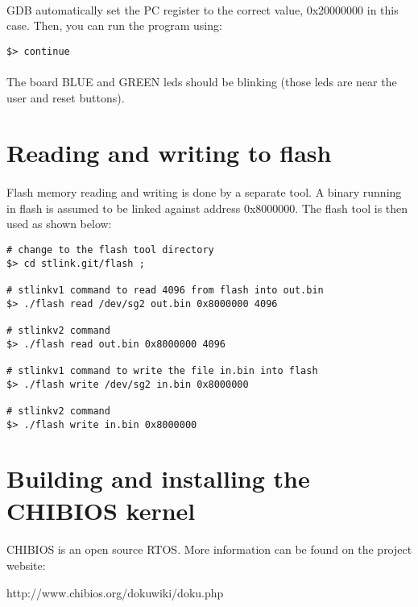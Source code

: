 \documentclass[a4paper, 11pt]{article}
\begin{document}
\paragraph{}
GDB automatically set the PC register to the correct value, 0x20000000 in this case. Then, you
can run the program using:\\
\begin{small}
\begin{lstlisting}[frame=tb]
$> continue
\end{lstlisting}
\end{small}

\paragraph{}
The board BLUE and GREEN leds should be blinking (those leds are near the user and reset buttons).


\newpage
\section{Reading and writing to flash}
\paragraph{}
Flash memory reading and writing is done by a separate tool. A binary running in flash is assumed to
be linked against address 0x8000000. The flash tool is then used as shown below:\\
\begin{small}
\begin{lstlisting}[frame=tb]
# change to the flash tool directory
$> cd stlink.git/flash ;

# stlinkv1 command to read 4096 from flash into out.bin
$> ./flash read /dev/sg2 out.bin 0x8000000 4096

# stlinkv2 command
$> ./flash read out.bin 0x8000000 4096

# stlinkv1 command to write the file in.bin into flash
$> ./flash write /dev/sg2 in.bin 0x8000000

# stlinkv2 command
$> ./flash write in.bin 0x8000000
\end{lstlisting}
\end{small}


\newpage
\section{Building and installing the CHIBIOS kernel}
\paragraph{}
CHIBIOS is an open source RTOS. More information can be found on the project website:
\begin{center}
http://www.chibios.org/dokuwiki/doku.php
\end{center}
\end{document}

